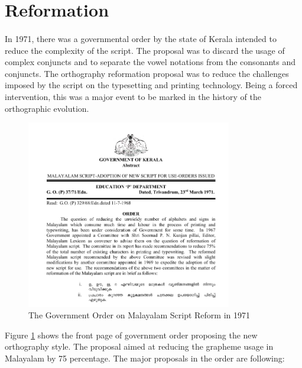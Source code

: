 \documentclass[10pt]{article}
\begin{document}
\section{Reformation}

\paragraph{}
In 1971, there was a governmental order by the state of Kerala intended to reduce the complexity of the script. The proposal was to discard the usage of complex conjuncts and to separate the vowel notations from the consonants and conjuncts. The orthography reformation proposal was to reduce the challenges imposed by the script on the typesetting and printing technology. Being a forced intervention, this was a major event to be marked in the history of the orthographic evolution. 

\begin{figure}[h]
 \centering
  \includegraphics[width=0.8\textwidth]{images/1971-gov-script-reformation-order.png}
   \caption{The Government Order on Malayalam Script Reform in 1971}
	\label{go1971}
\end{figure}

Figure \ref{go1971} shows the front page of government order proposing the new orthography style. The proposal aimed at reducing the grapheme usage in Malayalam by 75 percentage. The major proposals in the order are following:\cite{1971go}
\end{document}
